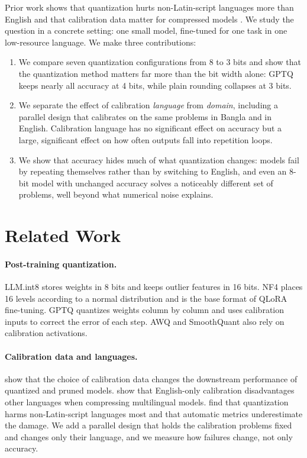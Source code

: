 \documentclass[11pt]{article}
\begin{document}
Prior work shows that quantization hurts non-Latin-script languages more than English \citep{marchisio2024quantization} and that calibration data matter for compressed models \citep{williams2024calibration,zeng2024multilingual}. We study the question in a concrete setting: one small model, fine-tuned for one task in one low-resource language. We make three contributions:

\begin{enumerate}
  \setlength\itemsep{0pt}
  \item We compare seven quantization configurations from 8 to 3 bits and show that the quantization method matters far more than the bit width alone: GPTQ keeps nearly all accuracy at 4 bits, while plain rounding collapses at 3 bits.
  \item We separate the effect of calibration \emph{language} from \emph{domain}, including a parallel design that calibrates on the same problems in Bangla and in English. Calibration language has no significant effect on accuracy but a large, significant effect on how often outputs fall into repetition loops.
  \item We show that accuracy hides much of what quantization changes: models fail by repeating themselves rather than by switching to English, and even an 8-bit model with unchanged accuracy solves a noticeably different set of problems, well beyond what numerical noise explains.
\end{enumerate}

\section{Related Work}

\paragraph{Post-training quantization.}
LLM.int8 \citep{dettmers2022llmint8} stores weights in 8 bits and keeps outlier features in 16 bits. NF4 \citep{dettmers2023qlora} places 16 levels according to a normal distribution and is the base format of QLoRA fine-tuning. GPTQ \citep{frantar2023gptq} quantizes weights column by column and uses calibration inputs to correct the error of each step. AWQ \citep{lin2024awq} and SmoothQuant \citep{xiao2023smoothquant} also rely on calibration activations.

\paragraph{Calibration data and languages.}
\citet{williams2024calibration} show that the choice of calibration data changes the downstream performance of quantized and pruned models. \citet{zeng2024multilingual} show that English-only calibration disadvantages other languages when compressing multilingual models. \citet{marchisio2024quantization} find that quantization harms non-Latin-script languages most and that automatic metrics underestimate the damage. We add a parallel design that holds the calibration problems fixed and changes only their language, and we measure how failures change, not only accuracy.
\end{document}
